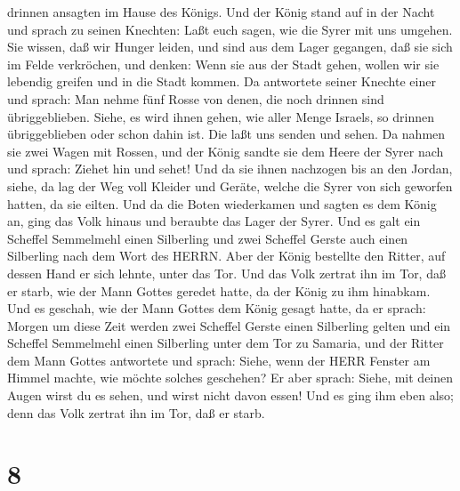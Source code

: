 drinnen ansagten im Hause des Königs.  Und der König stand
auf in der Nacht und sprach zu seinen Knechten: Laßt euch sagen, wie die
Syrer mit uns umgehen. Sie wissen, daß wir Hunger leiden, und sind aus
dem Lager gegangen, daß sie sich im Felde verkröchen, und denken: Wenn
sie aus der Stadt gehen, wollen wir sie lebendig greifen und in die
Stadt kommen.  Da antwortete seiner Knechte einer und
sprach: Man nehme fünf Rosse von denen, die noch drinnen sind
übriggeblieben. Siehe, es wird ihnen gehen, wie aller Menge Israels, so
drinnen übriggeblieben oder schon dahin ist. Die laßt uns senden und
sehen.  Da nahmen sie zwei Wagen mit Rossen, und der König
sandte sie dem Heere der Syrer nach und sprach: Ziehet hin und sehet!
 Und da sie ihnen nachzogen bis an den Jordan, siehe, da
lag der Weg voll Kleider und Geräte, welche die Syrer von sich geworfen
hatten, da sie eilten. Und da die Boten wiederkamen und sagten es dem
König an,  ging das Volk hinaus und beraubte das Lager der
Syrer. Und es galt ein Scheffel Semmelmehl einen Silberling und zwei
Scheffel Gerste auch einen Silberling nach dem Wort des HERRN.
 Aber der König bestellte den Ritter, auf dessen Hand er
sich lehnte, unter das Tor. Und das Volk zertrat ihn im Tor, daß er
starb, wie der Mann Gottes geredet hatte, da der König zu ihm hinabkam.
 Und es geschah, wie der Mann Gottes dem König gesagt
hatte, da er sprach: Morgen um diese Zeit werden zwei Scheffel Gerste
einen Silberling gelten und ein Scheffel Semmelmehl einen Silberling
unter dem Tor zu Samaria,  und der Ritter dem Mann Gottes
antwortete und sprach: Siehe, wenn der HERR Fenster am Himmel machte,
wie möchte solches geschehen? Er aber sprach: Siehe, mit deinen Augen
wirst du es sehen, und wirst nicht davon essen!  Und es
ging ihm eben also; denn das Volk zertrat ihn im Tor, daß er starb.

\hypertarget{section-7}{%
\section{8}\label{section-7}}

